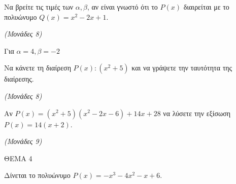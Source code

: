 \documentclass[11pt,a4paper,twoside]{book}
\newcommand{\monades}[1]{\hfill \textit{(Μονάδες #1)}}
\begin{document}
\begin{alist}
\item Να βρείτε τις τιμές των $\alpha, \beta$, αν είναι γνωστό ότι το $P(x)$ διαιρείται με το πολυώνυμο $Q(x) = x^2 - 2x + 1$.

\monades{8}

\item Για $\alpha = 4, \beta = -2$

\begin{rlist}
\item Να κάνετε τη διαίρεση $P(x) : (x^2 + 5)$ και να γράψετε την ταυτότητα της διαίρεσης.

\monades{8}

\item Αν $P(x) = (x^2 + 5)(x^2 - 2x - 6) + 14x + 28$ να λύσετε την εξίσωση $P(x) = 14(x + 2)$.

\monades{9}
\end{rlist}
\end{alist}

\vspace{4mm}

ΘΕΜΑ 4

Δίνεται το πολυώνυμο $P(x) = -x^3 - 4x^2 - x + 6$.
\end{document}
